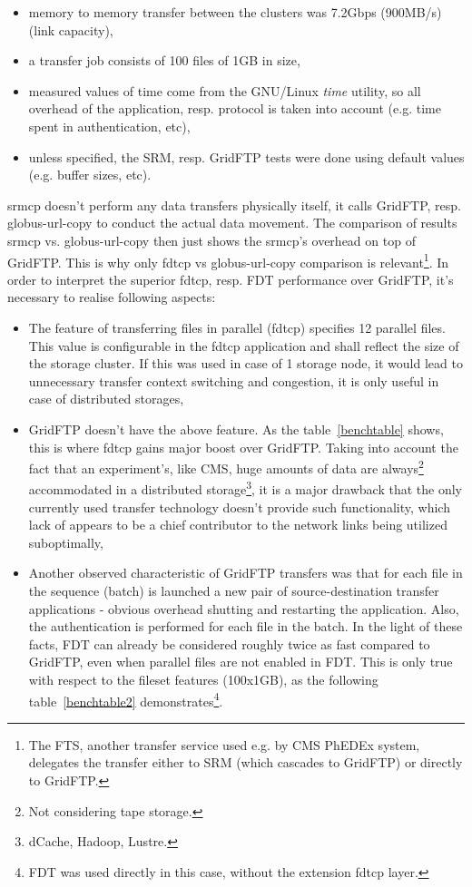 \documentclass[a4paper]{jpconf}
\begin{document}
\begin{itemize}
\item memory to memory transfer between the clusters was 7.2Gbps
(900MB/s) (link capacity),
\item a transfer job consists of 100 files of 1GB in size,
\item measured values of time come from the GNU/Linux \emph{time} utility,
so all
overhead of the application, resp. protocol is taken into account (e.g. time
spent in authentication, etc),
\item unless specified, the SRM, resp. GridFTP tests were done using
default values (e.g. buffer sizes, etc).
\end{itemize}

srmcp doesn't perform any data transfers physically itself, it calls
GridFTP, resp. globus-url-copy to conduct the
actual data movement. The comparison of results srmcp vs. globus-url-copy then
just shows the srmcp's overhead on top of GridFTP. This is why only
fdtcp vs globus-url-copy comparison is relevant\footnote{The FTS, another
transfer service used e.g. by CMS PhEDEx system, delegates the transfer either
to SRM (which cascades to GridFTP) or directly to GridFTP.}. In order to
interpret the superior fdtcp, resp. FDT performance over GridFTP, it's
necessary to realise following aspects:

\begin{itemize}
\item The feature of transferring files in parallel (fdtcp) specifies 12
parallel files. This value is configurable in the fdtcp application and shall
reflect the size of the storage cluster. If this was used in case of 1
storage node, it would lead to unnecessary transfer context switching and
congestion, it is only useful in case of distributed storages,

\item GridFTP doesn't have the above feature. As the
table~\ref{benchtable} shows, this is where fdtcp gains major boost over
GridFTP.
Taking into account the fact that an experiment's, like CMS, huge
amounts of data are always\footnote{Not considering tape storage.}
accommodated in a distributed storage\footnote{dCache, Hadoop, Lustre.}, it is
a major drawback that the only currently used transfer
technology doesn't provide such functionality, which lack of appears to be a
chief contributor to the network links being utilized suboptimally, 

\item Another observed characteristic of GridFTP transfers
was that for each file in
the sequence (batch) is launched a new pair of source-destination transfer
applications - obvious overhead shutting and restarting the application.
Also, the authentication is performed for each file in the
batch. In the light of these facts, FDT can already be considered roughly
twice as fast compared to GridFTP, even when parallel files are not 
enabled in FDT.
This is only true with respect to the fileset features (100x1GB), as the
following table~\ref{benchtable2} demonstrates\footnote{FDT was used directly
in this case, without the extension fdtcp layer.}.
\end{itemize}
\end{document}
